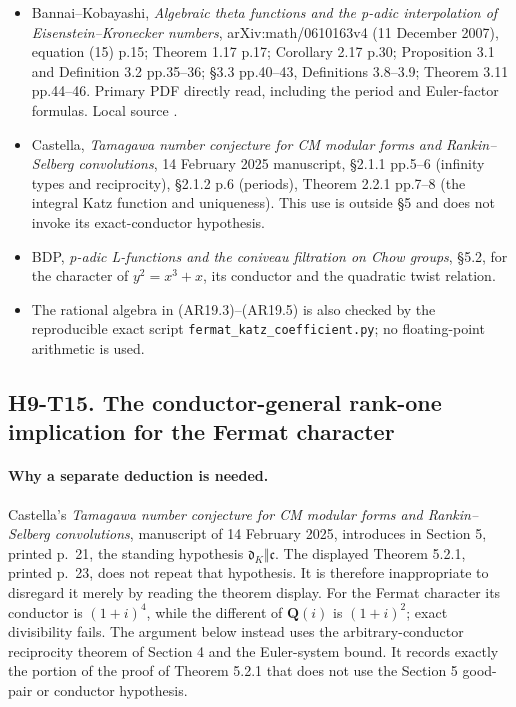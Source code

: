 \documentclass[11pt,a4paper]{article}
\providecommand{\tightlist}{\setlength{\itemsep}{0pt}\setlength{\parskip}{0pt}}
\begin{document}
\begin{itemize}
\tightlist
\item
  Bannai--Kobayashi, \emph{Algebraic theta functions and the p-adic
  interpolation of Eisenstein--Kronecker numbers}, arXiv:math/0610163v4
  (11 December 2007), equation (15) p.15; Theorem 1.17 p.17; Corollary
  2.17 p.30; Proposition 3.1 and Definition 3.2 pp.35--36; §3.3
  pp.40--43, Definitions 3.8--3.9; Theorem 3.11 pp.44--46. Primary PDF
  directly read, including the period and Euler-factor formulas. Local
  source .
\item
  Castella, \emph{Tamagawa number conjecture for CM modular forms and
  Rankin--Selberg convolutions}, 14 February 2025 manuscript, §2.1.1
  pp.5--6 (infinity types and reciprocity), §2.1.2 p.6 (periods),
  Theorem 2.2.1 pp.7--8 (the integral Katz function and uniqueness).
  This use is outside §5 and does not invoke its exact-conductor
  hypothesis.
\item
  BDP, \emph{p-adic L-functions and the coniveau filtration on Chow
  groups}, §5.2, for the character of \(y^2=x^3+x\), its conductor and
  the quadratic twist relation.
\item
  The rational algebra in (AR19.3)--(AR19.5) is also checked by the
  reproducible exact script \texttt{fermat\_katz\_coefficient.py}; no
  floating-point arithmetic is used.
\end{itemize}

\subsection*{H9-T15. The conductor-general rank-one implication for the Fermat character}

\paragraph{Why a separate deduction is needed.}
Castella's \emph{Tamagawa number conjecture for CM modular forms and
Rankin--Selberg convolutions}, manuscript of 14 February 2025,
introduces in Section 5, printed p.~21, the standing hypothesis
$\mathfrak d_K\Vert\mathfrak c$. The displayed Theorem 5.2.1,
printed p.~23, does not repeat that hypothesis. It is therefore
inappropriate to disregard it merely by reading the theorem display.
For the Fermat character its conductor is $(1+i)^4$, while the
different of $\mathbf Q(i)$ is $(1+i)^2$; exact divisibility fails.
The argument below instead uses the arbitrary-conductor reciprocity
theorem of Section 4 and the Euler-system bound. It records exactly
the portion of the proof of Theorem 5.2.1 that does not use the
Section 5 good-pair or conductor hypothesis.
\end{document}
